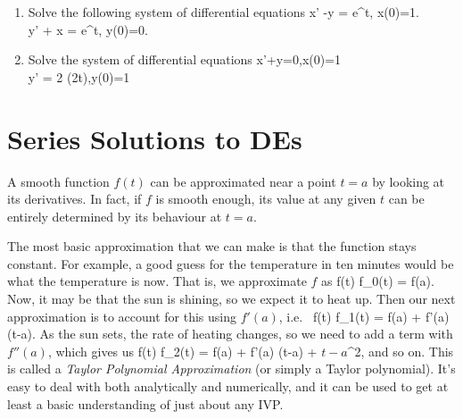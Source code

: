 \documentclass[12pt]{book}
\begin{document}
\begin{enumerate}
  \item
    Solve the following system of differential equations
    \bee
    x' -y = e^t, \qquad x(0)=1.
    \\
    y' + x = e^t, \qquad y(0)=0.
    \eee

    \item
      Solve the system of differential equations 
      \bee
      x'+y=0,\qquad x(0)=1
      \\
      y' = 2 \cosh(2t),\qquad y(0)=1
      \eee

\end{enumerate}


\chapter{Series Solutions to DEs}

A smooth function $f(t)$ can be approximated near a point $t=a$ by looking 
at its derivatives. In fact, if $f$ is smooth enough, its value at any
given $t$ can be entirely determined by its behaviour at $t=a$.

The most basic approximation that we can make is that the function stays 
constant. For example, a good guess for the temperature in ten minutes would
be what the temperature is now. That is, we approximate $f$ as
\bee
f(t) \approx f_0(t) = f(a).
\eee
Now, it may be that the sun is shining, so we expect it to heat up. Then our 
next approximation is to account for this using $f'(a)$, i.e.\
\bee
f(t) \approx f_1(t) = f(a) + f'(a) (t-a).
\eee
As the sun sets, the rate of heating changes, so we need to add a term with
$f''(a)$, which gives us
\bee
f(t) \approx f_2(t) = f(a) + f'(a) (t-a) + \(t-a\)^2,
\eee
and so on. This is called a \emph{Taylor Polynomial Approximation} (or simply a
Taylor polynomial). It's easy to deal with both analytically and numerically,
and it can be used to get at least a basic understanding of just about any IVP.
\end{document}
